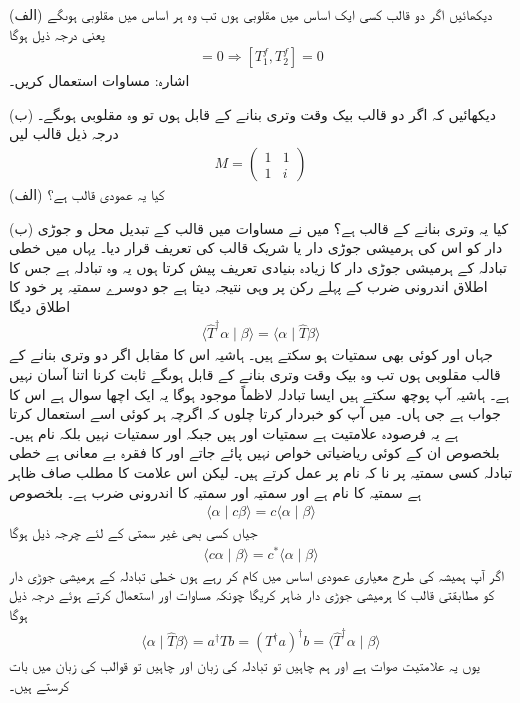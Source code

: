 (الف) دیکھائیں اگر دو قالب کسی ایک اساس میں مقلوبی ہوں تب وہ ہر اساس میں مقلوبی ہوںگے یعنی درجہ ذیل ہوگا
\begin{align}
	[T^e_1, T^e_2] = 0 \Rightarrow [T^f_1, T^f_2] = 0
\end{align}
اشارہ: مساوات  استعمال کریں۔

(ب) دیکھائیں کہ اگر دو قالب بیک وقت وتری بنانے کے قابل ہوں تو وہ مقلوبی ہوںگے۔
درجہ ذیل قالب لیں
\begin{align*}
	M=
	\begin{pmatrix}
		1 & 1\\
		1 & i
	\end{pmatrix}
\end{align*}
(الف) کیا یہ عمودی قالب ہے؟

(ب) کیا یہ وتری بنانے کے قالب ہے؟
میں نے مساوات  میں قالب کے تبدیل محل و جوڑی دار  کو اس کی ہرمیشی جوڑی دار یا شریک قالب کی تعریف قرار دیا۔ یہاں میں خطی تبادلہ کے ہرمیشی جوڑی دار کا زیادہ بنیادی تعریف پیش کرتا ہوں یہ وہ تبادلہ  ہے جس کا اطلاق اندرونی ضرب کے پہلے رکن پر وہی نتیجہ دیتا ہے جو دوسرے سمتیہ پر خود  کا اطلاق دیگا
\begin{align}
	\langle\hat{T}^{\dagger}\alpha\mid\beta\rangle = \langle\alpha\mid\hat{T}\beta\rangle
\end{align}
جہاں  اور  کوئی بھی سمتیات ہو سکتے ہیں۔ ہاشیہ اس کا مقابل اگر دو وتری بنانے کے قالب مقلوبی ہوں تب وہ بیک وقت وتری بنانے کے قابل ہوںگے ثابت کرنا اتنا آسان نہیں ہے۔ ہاشیہ آپ پوچھ سکتے ہیں ایسا تبادلہ لاظماً موجود ہوگا یہ ایک اچھا سوال ہے اس کا جواب ہے جی ہاں۔ میں آپ کو خبردار کرتا چلوں کہ اگرچہ ہر کوئی اسے استعمال کرتا ہے یہ فرصودہ علامتیت ہے سمتیات  اور  ہیں جبکہ  اور  سمتیات نہیں بلکہ نام ہیں۔ بلخصوص ان کے کوئی ریاضیاتی خواص نہیں پائے جاتے اور  کا فقرہ بے معانی ہے خطی تبادلہ کسی سمتیہ پر نا کہ نام پر عمل کرتے ہیں۔ لیکن اس علامت کا مطلب صاف ظاہر ہے سمتیہ  کا نام  ہے اور سمتیہ  اور سمتیہ  کا اندرونی ضرب  ہے۔ بلخصوص
\begin{align}
	\langle\alpha\mid c\beta\rangle = c\langle\alpha\mid\beta\rangle
\end{align}
جیاں کسی بھی غیر سمتی  کے لئے چرجہ ذیل ہوگا
\begin{align}
	\langle c\alpha\mid\beta\rangle = c^{*}\langle\alpha\mid\beta\rangle
\end{align}
اگر آپ ہمیشہ کی طرح معیاری عمودی اساس میں کام کر رہے ہوں خطی تبادلہ کے ہرمیشی جوڑی دار کو مطابقتی قالب کا ہرمیشی جوڑی دار ضاہر کریگا چونکہ مساوات  اور  استعمال کرتے ہوئے درجہ ذیل ہوگا
\begin{align}
	\langle\alpha\mid\hat{T}\beta\rangle = a^\dagger Tb = (T^\dagger a)^\dagger b = \langle\hat{T}^\dagger\alpha\mid\beta\rangle
\end{align}
یوں یہ علامتیت صوات ہے اور ہم چاہیں تو تبادلہ کی زبان اور چاہیں تو قوالب کی زبان میں بات کرستے ہیں۔

